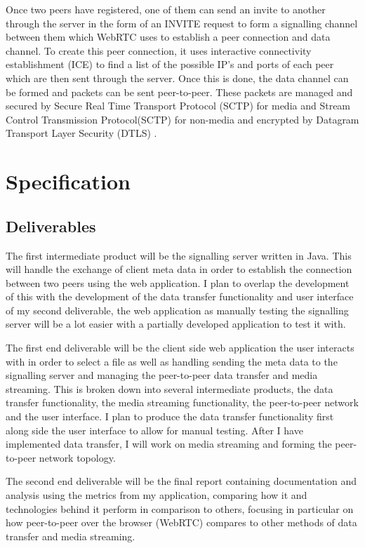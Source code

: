 \documentclass[]{report}
\begin{document}
			Once two peers have registered, one of them can send an invite to another through the server in the form of an INVITE request to form a signalling channel between them which WebRTC uses to establish a peer connection and data channel. To create this peer connection, it uses interactive connectivity establishment (ICE) to find a list of the possible IP's and ports of each peer which are then sent through the server. Once this is done, the data channel can be formed and packets can be sent peer-to-peer. These packets are managed and secured by Secure Real Time Transport Protocol (SCTP) for media and Stream Control Transmission Protocol(SCTP) for non-media and encrypted by Datagram Transport Layer Security (DTLS) \cite{WebRTC Data Channel Establishment Protocol}.
						
	\section{Specification}
			\subsection*{Deliverables}
			The first intermediate product will be the signalling server written in Java. This will handle the exchange of client meta data in order to establish the connection between two peers using the web application. I plan to overlap the development of this with the development of the data transfer functionality and user interface of my second deliverable, the web application as manually testing the signalling server will be a lot easier with a partially developed application to test it with.
			
			The first end deliverable will be the client side web application the user interacts with in order to select a file as well as handling sending the meta data to the signalling server and managing the peer-to-peer data transfer and media streaming. This is broken down into several intermediate products, the data transfer functionality, the media streaming functionality, the peer-to-peer network and the user interface. I plan to produce the data transfer functionality first along side the user interface to allow for manual testing. After I have implemented data transfer, I will work on media streaming and forming the peer-to-peer network topology. 
			
			The second end deliverable will be the final report containing documentation and analysis using the metrics from my application, comparing how it and technologies behind it perform in comparison to others, focusing in particular on how peer-to-peer over the browser (WebRTC) compares to other methods of data transfer and media streaming.
			
\end{document}

